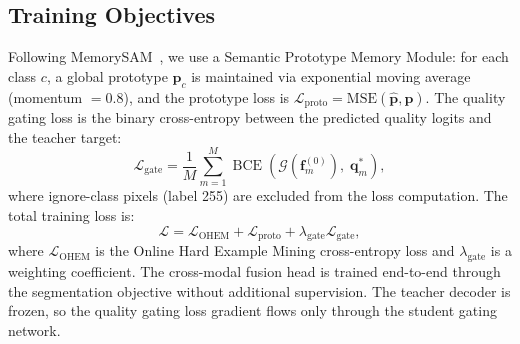 \subsection{Training Objectives}
\label{sec:training}

Following MemorySAM~\cite{chen2025memorysam}, we use a Semantic Prototype Memory Module: for each class $c$, a global prototype $\mathbf{p}_c$ is maintained via exponential moving average (momentum $= 0.8$), and the prototype loss is $\mathcal{L}_\text{proto} = \text{MSE}(\hat{\mathbf{p}}, \mathbf{p})$.
The quality gating loss is the binary cross-entropy between the predicted quality logits and the teacher target:
\begin{equation}
  \mathcal{L}_\text{gate} = \frac{1}{M} \sum_{m=1}^{M} \operatorname{BCE}(\mathcal{G}(\mathbf{f}_m^{(0)}),\; \mathbf{q}^*_m),
  \label{eq:gate_loss}
\end{equation}
where ignore-class pixels (label 255) are excluded from the loss computation.
The total training loss is:
\begin{equation}
  \mathcal{L} = \mathcal{L}_\text{OHEM} + \mathcal{L}_\text{proto} + \lambda_\text{gate} \mathcal{L}_\text{gate},
  \label{eq:total_loss}
\end{equation}
where $\mathcal{L}_\text{OHEM}$ is the Online Hard Example Mining cross-entropy loss and $\lambda_\text{gate}$ is a weighting coefficient.
The cross-modal fusion head is trained end-to-end through the segmentation objective without additional supervision.
The teacher decoder is frozen, so the quality gating loss gradient flows only through the student gating network.


